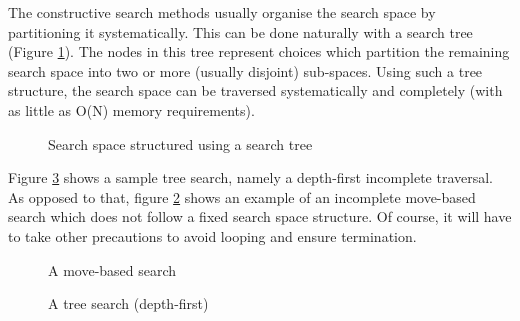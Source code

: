 The constructive search methods usually organise the search space by
partitioning it systematically.  This can be done naturally with a
search tree (Figure \ref{figsearchtree}).  The nodes in this tree
represent choices which partition the remaining search space into two
or more (usually disjoint) sub-spaces.  Using such
a tree structure, the search space can be traversed systematically and
completely (with as little as O(N) memory requirements).

\begin{figure}
\begin{center}
\end{center}
\caption{Search space structured using a search tree}
\label{figsearchtree}
\end{figure}
Figure \ref{figtreesearch} shows a sample tree search, namely a depth-first
incomplete traversal.
As opposed to that, figure \ref{figmovesearch} shows an example of an
incomplete move-based search which does not follow a fixed search space
structure. Of course, it will have to take other precautions to avoid
looping and ensure termination.
\begin{figure}
\begin{center}
\end{center}
\caption{A move-based search}
\label{figmovesearch}
\end{figure}

\begin{figure}
\begin{center}
\end{center}
\caption{A tree search (depth-first)}
\label{figtreesearch}
\end{figure}

